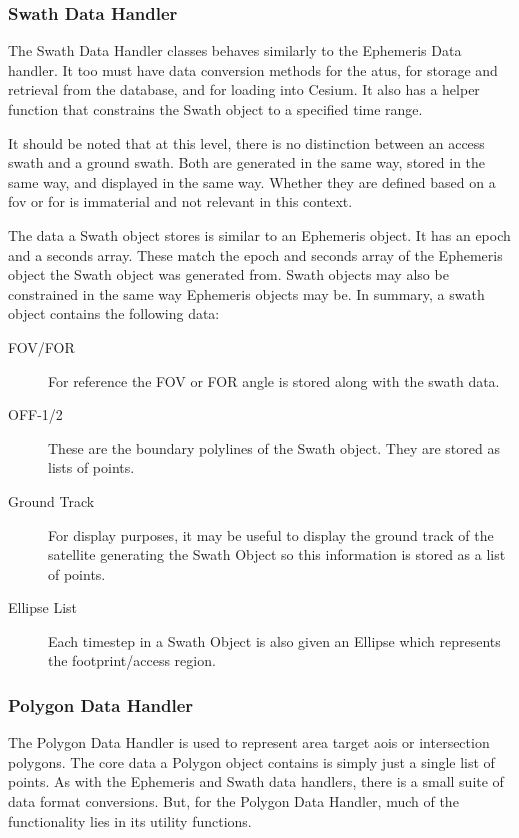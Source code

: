 \subsubsection{Swath Data Handler}

The Swath Data Handler classes behaves similarly to the Ephemeris Data handler.
It too must have data conversion methods for the \glspl{atu}, for storage and
retrieval from the database, and for loading into Cesium. It also has a helper
function that constrains the Swath object to a specified time range. 

It should be noted that at this level, there is no distinction between an
access swath and a ground swath. Both are generated in the same way, stored in
the same way, and displayed in the same way. Whether they are defined based on
a \gls{fov} or \gls{for} is immaterial and not relevant in this context. 

The data a Swath object stores is similar to an Ephemeris object. It has an
epoch and a seconds array. These match the epoch and seconds array of the
Ephemeris object the Swath object was generated from. Swath objects may also be
constrained in the same way Ephemeris objects may be. In summary, a swath
object contains the following data:

\begin{description} 

    \item[FOV/FOR] For reference the FOV or FOR angle is stored along with the
	swath data.

    \item[OFF-1/2] These are the boundary polylines of the Swath object. They
	are stored as lists of points.

    \item[Ground Track] For display purposes, it may be useful to display the
	ground track of the satellite generating the Swath Object so this
	information is stored as a list of points.

    \item[Ellipse List] Each timestep in a Swath Object is also given an
	Ellipse which represents the footprint/access region. 

\end{description}


\subsubsection{Polygon Data Handler}

The Polygon Data Handler is used to represent area target \glspl{aoi} or
intersection polygons. The core data a Polygon object contains is simply just a
single list of points.  As with the Ephemeris and Swath data handlers, there is
a small suite of data format conversions.  But, for the Polygon Data Handler,
much of the functionality lies in its utility functions.

